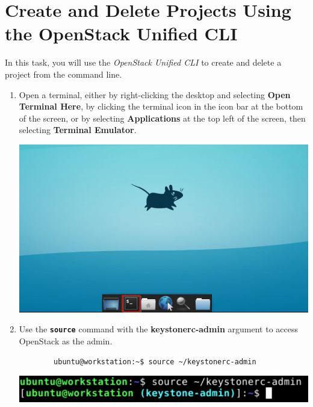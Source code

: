 \documentclass[letterpaper, 12pt]{article}
\begin{document}
\section{Create and Delete Projects Using the OpenStack Unified CLI}
\label{sec:create_and_delete_projects_using_the_openstack_unified_cli}
In this task, you will use the \textit{OpenStack Unified CLI} to create and delete a project from the command line.

\begin{enumerate}    
    \item Open a terminal, either by right-clicking the desktop and selecting \textbf{Open Terminal Here}, by clicking
    the terminal icon in the icon bar at the bottom of the screen, or by selecting \textbf{Applications} at the top
    left of the screen, then selecting \textbf{Terminal Emulator}.

    \begin{center}
        \includegraphics[width=\linewidth]{images/part2/step1.png}
    \end{center}

    \item Use the \textbf{\texttt{source}} command with the \textbf{keystonerc-admin} argument to access OpenStack
    as the admin.
    \begin{lstlisting}
        ubuntu@workstation:~$ source ~/keystonerc-admin
    \end{lstlisting}
    
    \begin{center}
        \includegraphics[width=\linewidth]{images/part2/step2.png}
    \end{center}


\end{enumerate}
\end{document}
